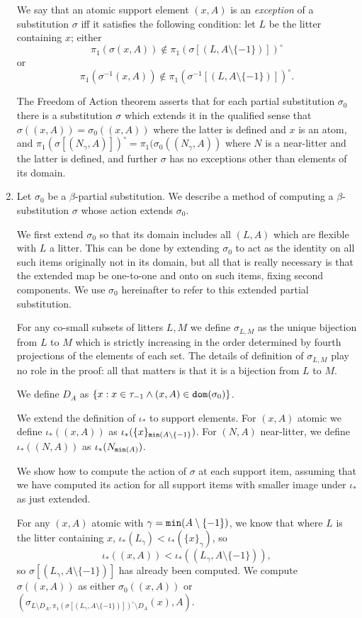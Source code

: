 \documentclass[12pt]{article}
\begin{document}
\begin{enumerate}
 We say that an atomic support element $(x,A)$ is an {\em exception\/} of a substitution $\sigma$ iff it satisfies the following condition:
let $L$ be the litter containing $x$; either $$\pi_1(\sigma(x,A)) \not\in \pi_1(\sigma[(L,A \setminus \{-1\})])^\circ$$ or $$\pi_1(\sigma^{-1}(x,A)) \not\in \pi_1(\sigma^{-1}[(L,A \setminus \{-1\})])^\circ.$$

The Freedom of Action theorem asserts that for each partial substitution $\sigma_0$  there is a substitution $\sigma$ which extends it in the qualified sense that $\sigma((x,A)) =\sigma_0((x,A))$ where the latter is defined and $x$ is an atom, and $\pi_1(\sigma[(N_\gamma,A)])^\circ = \pi_1(\sigma_0((N_\gamma,A))$ where $N$ is a near-litter and the latter is defined, and further $\sigma$ has no exceptions other than elements of its domain.

\item  Let $\sigma_0$ be a $\beta$-partial substitution.  We describe a method of computing a $\beta$-substitution $\sigma$ whose action extends $\sigma_0$.

We first extend $\sigma_0$ so that its domain includes all $(L,A)$ which are flexible with $L$ a litter.  This can be done by extending $\sigma_0$ to act as the identity on all such items originally not in its domain, but all that is really necessary is that the extended map be one-to-one and onto on such items, fixing second components.  We use $\sigma_0$ hereinafter to refer to this extended partial substitution.

For any co-small subsets of litters $L,M$ we define $\sigma_{L,M}$ as the unique bijection from $L$ to $M$ which is strictly increasing in the order determined by fourth projections of the elements of each set.  The details of definition of $\sigma_{L,M}$ play no role in the proof: all that matters is that it is a bijection from $L$ to $M$.

We define $D_A$ as $\{x:x \in \tau_{-1} \wedge (x,A) \in {\tt dom}(\sigma_0)\}$.

We extend the definition of $\iota_*$ to support elements.  For $(x,A)$ atomic we define $\iota_*((x,A))$ as $\iota_*(\{x\}_{{\tt min}(A\setminus \{-1\}})$.  For $(N,A)$ near-litter, we define $\iota_*((N,A))$ as $\iota_*(N_{{\tt min}(A)})$.

We show how to compute the action of $\sigma$ at each support item, assuming that we have computed its action for all support items with smaller image under $\iota_*$ as just extended.

For any $(x,A)$ atomic with $\gamma={\tt min}(A \setminus \{-1\})$, we know that where $L$ is the litter containing $x$, $\iota_*(L_\gamma)<\iota_*(\{x\}_\gamma)$, so $$\iota_*((x,A))<\iota_*((L_\gamma,A \setminus\{-1\})),$$ so $\sigma[(L_\gamma,A\setminus \{-1\})]$ has already been computed.  We compute $\sigma((x,A))$ as either $\sigma_0((x,A))$ or $(\sigma_{L\setminus D_A,\pi_1(\sigma[(L_\gamma,A\setminus \{-1\})])^\circ\setminus D_A}(x),A)$.


\end{enumerate}
\end{document}
